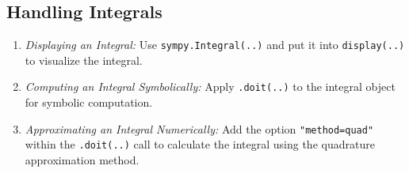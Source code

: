 \subsection{Handling Integrals}\label{subsec:handling_integrals}

\begin{enumerate}
    \item \emph{Displaying an Integral:}
    Use \texttt{sympy.Integral(..)} and put it into \texttt{display(..)} to visualize the integral.
    \item \emph{Computing an Integral Symbolically:}
    Apply \texttt{.doit(..)} to the integral object for symbolic computation.
    \item \emph{Approximating an Integral Numerically:}
    Add the option \texttt{"method=quad"} within the \texttt{.doit(..)} call to calculate the integral using the quadrature approximation method.
\end{enumerate}